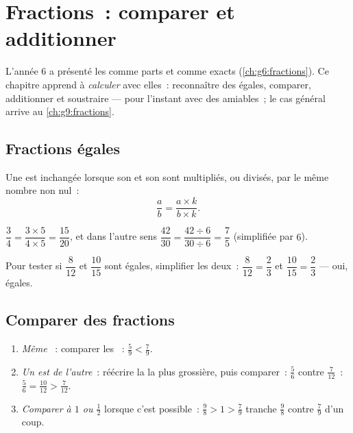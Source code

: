 \chapter{Fractions~: comparer et additionner}\label{ch:g7:fractions}

L'année 6 a présenté les  comme parts et comme 
exacts (\cref{ch:g6:fractions}). Ce chapitre apprend à
\emph{calculer} avec elles~: reconnaître des  égales,
comparer, additionner et soustraire --- pour l'instant avec des
 amiables~; le cas général arrive au
\cref{ch:g9:fractions}.

\section{Fractions égales}

\begin{theorem}\label{thm:g7:fractions:equal}
Une  est inchangée lorsque son  et son 
sont multipliés, ou divisés, par le même nombre non nul~:
\[
\frac{a}{b} = \frac{a \times k}{b \times k} .
\]
\end{theorem}
\admitted

\begin{example}\label{ex:g7:fractions:equal}
$\dfrac{3}{4} = \dfrac{3 \times 5}{4 \times 5} = \dfrac{15}{20}$, et
dans l'autre sens $\dfrac{42}{30} = \dfrac{42 \div 6}{30 \div 6}
= \dfrac{7}{5}$ (simplifiée par $6$).

Pour tester si $\dfrac{8}{12}$ et $\dfrac{10}{15}$ sont égales,
simplifier les deux~: $\dfrac{8}{12} = \dfrac{2}{3}$ et
$\dfrac{10}{15} = \dfrac{2}{3}$ --- oui, égales.
\end{example}

\section{Comparer des fractions}

\begin{method}\label{met:g7:fractions:compare}
\begin{enumerate}
  \item \emph{Même }~: comparer les ~:
        $\frac{5}{9} < \frac{7}{9}$.
  \item \emph{Un  est  de l'autre}~: réécrire la
         la plus grossière, puis comparer~:
        $\frac{5}{6}$ contre $\frac{7}{12}$~: $\frac56 = \frac{10}{12}
        > \frac{7}{12}$.
  \item \emph{Comparer à $1$ ou $\frac12$} lorsque c'est possible~:
        $\frac{9}{8} > 1 > \frac{7}{9}$ tranche
        $\frac98$ contre $\frac79$ d'un coup.
\end{enumerate}
\end{method}

